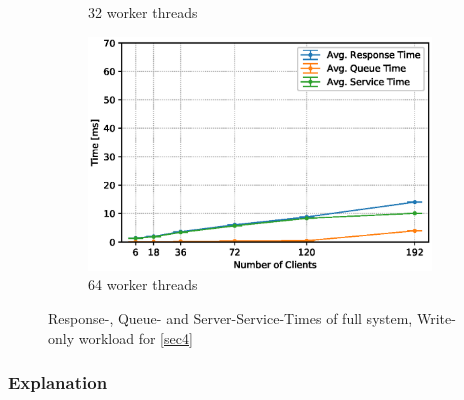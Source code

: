 \documentclass[11pt,a4paper]{article}
\begin{document}
\begin{figure}
\begin{subfigure}{.5\textwidth}
        \caption{32 worker threads}
    \end{subfigure}
    \begin{subfigure}{.5\textwidth}
        \includegraphics[width=1\linewidth]{plots/4b_extendedLatencyMiddleware_64w.eps}
        \caption{64 worker threads}
    \end{subfigure}

    \caption{Response-, Queue- and Server-Service-Times of full system, Write-only workload for \autoref{sec4}}
    \label{fig:4-times}
\end{figure}
\subsubsection{Explanation}
\end{document}
